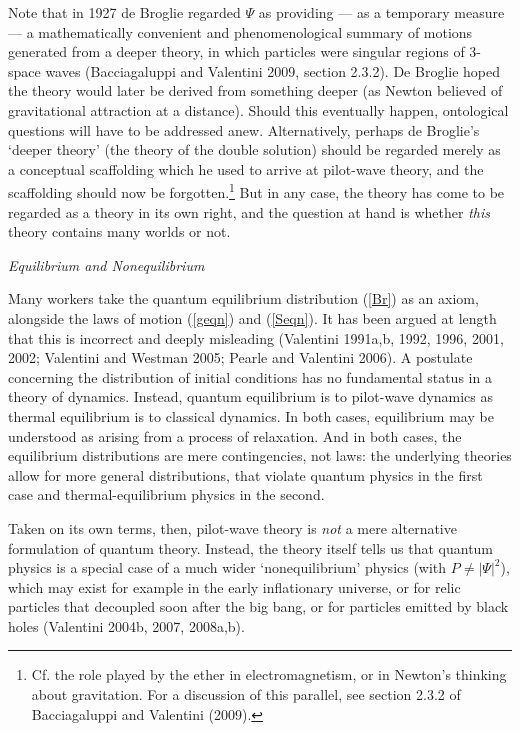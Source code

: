 \documentclass{article}%
\begin{document}
Note that in 1927 de Broglie regarded $\Psi$ as providing --- as a temporary
measure --- a mathematically convenient and phenomenological summary of
motions generated from a deeper theory, in which particles were singular
regions of 3-space waves (Bacciagaluppi and Valentini 2009, section 2.3.2). De
Broglie hoped the theory would later be derived from something deeper (as
Newton believed of gravitational attraction at a distance). Should this
eventually happen, ontological questions will have to be addressed anew.
Alternatively, perhaps de Broglie's `deeper theory' (the theory of the double
solution) should be regarded merely as a conceptual scaffolding which he used
to arrive at pilot-wave theory, and the scaffolding should now be
forgotten.\footnote{Cf. the role played by the ether in electromagnetism, or
in Newton's thinking about gravitation. For a discussion of this parallel, see
section 2.3.2 of Bacciagaluppi and Valentini (2009).} But in any case, the
theory has come to be regarded as a theory in its own right, and the question
at hand is whether \textit{this} theory contains many worlds or not.

\begin{center}
\textit{Equilibrium and Nonequilibrium}
\end{center}

Many workers take the quantum equilibrium distribution (\ref{Br}) as an axiom,
alongside the laws of motion (\ref{geqn}) and (\ref{Seqn}). It has been argued
at length that this is incorrect and deeply misleading (Valentini 1991a,b,
1992, 1996, 2001, 2002; Valentini and Westman 2005; Pearle and Valentini
2006). A postulate concerning the distribution of initial conditions has no
fundamental status in a theory of dynamics. Instead, quantum equilibrium is to
pilot-wave dynamics as thermal equilibrium is to classical dynamics. In both
cases, equilibrium may be understood as arising from a process of relaxation.
And in both cases, the equilibrium distributions are mere contingencies, not
laws: the underlying theories allow for more general distributions, that
violate quantum physics in the first case and thermal-equilibrium physics in
the second.

Taken on its own terms, then, pilot-wave theory is \textit{not} a mere
alternative formulation of quantum theory. Instead, the theory itself tells us
that quantum physics is a special case of a much wider `nonequilibrium'
physics (with $P\neq|\Psi|^{2}$), which may exist for example in the early
inflationary universe, or for relic particles that decoupled soon after the
big bang, or for particles emitted by black holes (Valentini 2004b, 2007, 2008a,b).
\end{document}
